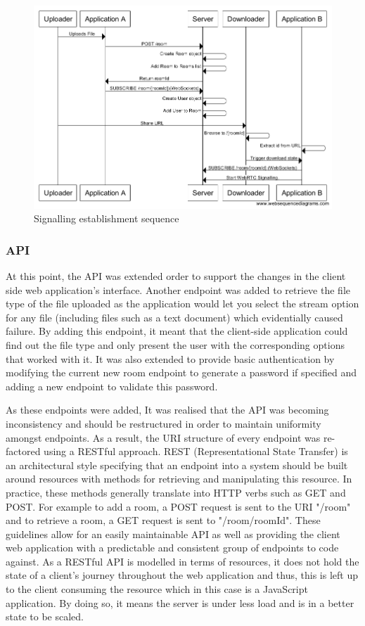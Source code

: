 \documentclass[]{report}
\begin{document}
				\begin{figure}[H]
					\caption{Signalling establishment sequence}
					\centering
					\includegraphics[scale=0.5]{signalling-establishment-sequence.png}
				\end{figure}
				
				\subsubsection*{API}
				At this point, the API was extended order to support the changes in the client side web application's interface. Another endpoint was added to retrieve the file type of the file uploaded as the application would let you select the stream option for any file (including files such as a text document) which evidentially caused failure. By adding this endpoint, it meant that the client-side application could find out the file type and only present the user with the corresponding options that worked with it. It was also extended to provide basic authentication by modifying the current new room endpoint to generate a password if specified and adding a new endpoint to validate this password. 
				
				As these endpoints were added, It was realised that the API was becoming inconsistency and should be restructured in order to maintain uniformity amongst endpoints. As a result, the URI structure of every endpoint was re-factored using a RESTful approach. REST (Representational State Transfer) is an architectural style specifying that an endpoint into a system should be built around resources with methods for retrieving and manipulating this resource. In practice, these methods generally translate into HTTP verbs such as GET and POST. For example to add a room, a POST request is sent to the URI "/room" and to retrieve a room, a GET request is sent to "/room/{roomId}". These guidelines allow for an easily maintainable API as well as providing the client web application with a predictable and consistent group of endpoints to code against. As a RESTful API is modelled in terms of resources, it does not hold the state of a client's journey throughout the web application and thus, this is left up to the client consuming the resource which in this case is a JavaScript application. By doing so, it means the server is under less load and is in a better state to be scaled.
				
\end{document}
